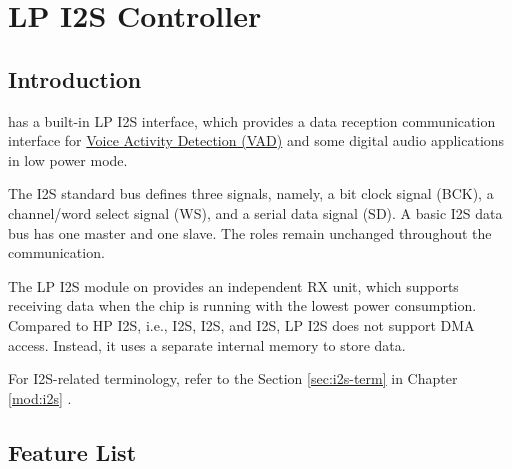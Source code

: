 \documentclass[main\_\_EN.tex]{subfiles}
\begin{document}

\ifglobal
\else
    {\let\clearpage\relax \listoftodos}
    {\let\clearpage\relax \listofdonetodos}
    \tableofcontents
\fi



\hypertarget{lpi2s}{}
\chapter{LP I2S Controller}
\label{mod:lpi2s}


\section{Introduction}

\chipname{} has a built-in LP I2S interface, which provides a data reception communication interface for \hyperref[mod:vad]{Voice Activity Detection (VAD)} and some digital audio applications in low power mode.

The I2S standard bus defines three signals, namely, a bit clock signal (BCK), a channel/word select signal (WS), and a serial data signal (SD). A basic I2S data bus has one master and one slave. The roles remain unchanged throughout the communication. 

The LP I2S module on \chipname{} provides an independent RX unit, which supports receiving data when the chip is running with the lowest power consumption. Compared to HP I2S, i.e., I2S, I2S, and I2S, LP I2S does not support DMA access. Instead, it uses a separate internal memory to store data.

\begin{tiplisting}
For I2S-related terminology, refer to the Section \ref{sec:i2s-term} \textit{} in Chapter \ref{mod:i2s} \textit{}.
\end{tiplisting}
\vspace{-1em}



\section{Feature List}
\label{sec:lpi2s-features}
\end{document}
